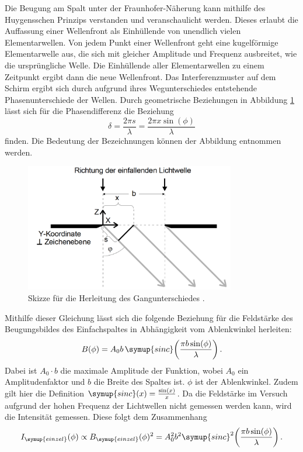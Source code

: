 Die Beugung am Spalt unter der Fraunhofer-Näherung kann mithilfe des Huygensschen
Prinzips verstanden und veranschaulicht werden. Dieses erlaubt die Auffassung einer
Wellenfront als Einhüllende von unendlich vielen Elementarwellen. Von jedem Punkt
einer Wellenfront geht eine kugelförmige Elementarwelle aus, die sich mit gleicher Amplitude und
Frequenz ausbreitet, wie die ursprüngliche Welle. Die Einhüllende aller Elementarwellen
zu einem Zeitpunkt ergibt dann die neue Wellenfront.
Das Interferenzmuster auf dem Schirm ergibt sich durch aufgrund ihres Wegunterschiedes
entstehende Phasenunterschiede der Wellen. Durch geometrische Beziehungen in
Abbildung \ref{fig:gangunterschied} lässt sich für die Phasendifferenz die
Beziehung
\begin{equation*}
  \delta = \frac{2\pi s}{\lambda} = \frac{2 \pi x \sin(\phi)}{\lambda}
\end{equation*}
finden.
Die Bedeutung der Bezeichnungen können der Abbildung entnommen werden.

\begin{figure}
  \centering
  \includegraphics[width=260pt]{data/gangunterschied.png}
  \caption{Skizze für die Herleitung des Gangunterschiedes \cite{Versuchsanleitung}.}
  \label{fig:gangunterschied}
\end{figure}


Mithilfe dieser Gleichung lässt sich die folgende Beziehung für
die Feldstärke des Beugungsbildes des Einfachspaltes in Abhängigkeit vom Ablenkwinkel herleiten:
\begin{equation*}
  B(\phi)= A_0 b \, \symup{sinc}\biggl(\frac{\pi b \sin(\phi)}{\lambda}\biggr) \,.
\end{equation*}
Dabei ist $A_0 \cdot b$ die maximale Amplitude der Funktion, wobei $A_0$ ein Amplitudenfaktor
und  $b$ die Breite des Spaltes ist.
 $\phi$ ist der Ablenkwinkel. Zudem gilt hier die Definition $\symup{sinc}(x)=\frac{\sin(x)}{x}$.
Da die Feldstärke im Versuch aufgrund der hohen Frequenz der Lichtwellen nicht gemessen
werden kann, wird die Intensität gemessen. Diese folgt dem Zusammenhang
\begin{equation}
  I_{\symup{einzel}}(\phi) \propto B_{\symup{einzel}}(\phi)^2=A_0^2 b^2 \symup{sinc}^2\biggl(\frac{\pi b \sin(\phi)}{\lambda}\biggr)  \,.
  \label{eqn:einzeltheo}
\end{equation}

